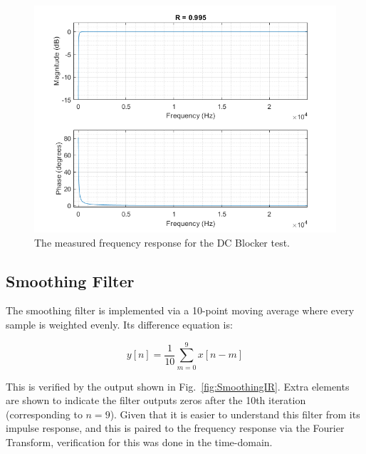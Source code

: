 \documentclass[../main.tex]{subfiles}
\begin{document}
\begin{figure}[h]
    \centering
    \includegraphics[scale=.53]{./images/plots/DCBlockerResponse.png}
    \caption{The measured frequency response for the DC Blocker test.}
    \label{fig:DCBlockerResponse}
\end{figure}

\subsection{Smoothing Filter}
\label{subsec:Ch4SmoothingFilter}
The smoothing filter is implemented via a 10-point moving average where every sample is weighted evenly. Its difference equation is:

\begin{equation}
    y[n] = \frac{1}{10} \sum_{m = 0}^{9}x[n-m]  
\end{equation}

This is verified by the output shown in Fig.~\ref{fig:SmoothingIR}. Extra elements are shown to indicate the filter outputs zeros after the 10th iteration (corresponding to $n = 9$). Given that it is easier to understand this filter from its impulse response, and this is paired to the frequency response via the Fourier Transform, verification for this was done in the time-domain.
\end{document}
